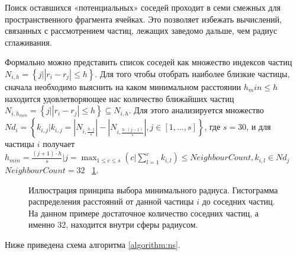Поиск оставшихся «потенциальных» соседей проходит в семи смежных для пространственного фрагмента ячейках. Это позволяет избежать вычислений, связанных с рассмотрением частиц, лежащих заведомо дальше, чем радиус сглаживания.

Формально можно представить список соседей как множество индексов частиц \(N_{i,h}=\left \{ j|\left | r_i-r_j \right | \leqslant h \right \}\). Для того чтобы отобрать наиболее близкие частицы, сначала необходимо выяснить на каком минимальном расстоянии \(h_min \leq  h\) находится удовлетворяющее нас количество ближайших частиц \(N_{i,h_{min}}=\left \{ j|\left | r_i-r_j \right | \leqslant h \right\} \subseteq N_{i,h}\). Для этого анализируется множество \(Nd_i=\left \{ k_{i,j}|k_{i,j}=\left | N_{i,\frac{h\cdot j}{s}} \right | - \left | N_{i,\frac{h\cdot (j-1)}{s}} \right |, j\in [1,...,s] \right \}\), где \(s=30\), и для частицы \(i\) получает \(h_{min}=\frac{(j+1)\cdot h}{s} |  j = \max_{1\leq c\leq s}\left ( c|\sum_{l=1}^{c} k_{i,l} \right )\leq NeighbourCount, k_{i,l} \in Nd_j\) \(NeighbourCount=32\) ~\ref{fig:ns_5}.
\begin{figure}[ht]
  \centerfloat{
    \texttt{[image: ns\_5]}
  }
  \caption{Иллюстрация принципа выбора минимального радиуса. Гистограмма распределения расстояний от данной частицы \(i\) до соседних частиц. На данном примере достаточное количество соседних частиц, а именно 32, находится внутри сферы радиусом.}
  \label{fig:ns_5}
\end{figure}
Ниже приведена схема алгоритма \ref{algorithm:ns}. 

